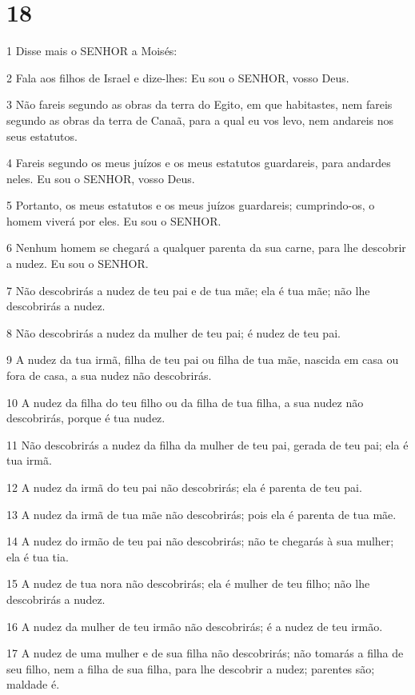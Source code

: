 \chapter{18}

\par 1 Disse mais o SENHOR a Moisés:
\par 2 Fala aos filhos de Israel e dize-lhes: Eu sou o SENHOR, vosso Deus.
\par 3 Não fareis segundo as obras da terra do Egito, em que habitastes, nem fareis segundo as obras da terra de Canaã, para a qual eu vos levo, nem andareis nos seus estatutos.
\par 4 Fareis segundo os meus juízos e os meus estatutos guardareis, para andardes neles. Eu sou o SENHOR, vosso Deus.
\par 5 Portanto, os meus estatutos e os meus juízos guardareis; cumprindo-os, o homem viverá por eles. Eu sou o SENHOR.
\par 6 Nenhum homem se chegará a qualquer parenta da sua carne, para lhe descobrir a nudez. Eu sou o SENHOR.
\par 7 Não descobrirás a nudez de teu pai e de tua mãe; ela é tua mãe; não lhe descobrirás a nudez.
\par 8 Não descobrirás a nudez da mulher de teu pai; é nudez de teu pai.
\par 9 A nudez da tua irmã, filha de teu pai ou filha de tua mãe, nascida em casa ou fora de casa, a sua nudez não descobrirás.
\par 10 A nudez da filha do teu filho ou da filha de tua filha, a sua nudez não descobrirás, porque é tua nudez.
\par 11 Não descobrirás a nudez da filha da mulher de teu pai, gerada de teu pai; ela é tua irmã.
\par 12 A nudez da irmã do teu pai não descobrirás; ela é parenta de teu pai.
\par 13 A nudez da irmã de tua mãe não descobrirás; pois ela é parenta de tua mãe.
\par 14 A nudez do irmão de teu pai não descobrirás; não te chegarás à sua mulher; ela é tua tia.
\par 15 A nudez de tua nora não descobrirás; ela é mulher de teu filho; não lhe descobrirás a nudez.
\par 16 A nudez da mulher de teu irmão não descobrirás; é a nudez de teu irmão.
\par 17 A nudez de uma mulher e de sua filha não descobrirás; não tomarás a filha de seu filho, nem a filha de sua filha, para lhe descobrir a nudez; parentes são; maldade é.
